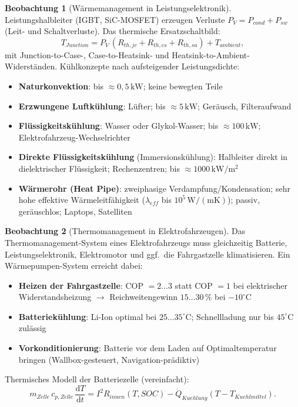 ﻿\documentclass[a4paper,12pt]{report}
\theoremstyle{definition}
\newtheorem{beobachtung}{Beobachtung}
\begin{document}
\begin{beobachtung}[Wärmemanagement in Leistungselektronik]
Leistungshalbleiter (IGBT, SiC-MOSFET) erzeugen Verluste
$P_V = P_{cond} + P_{sw}$ (Leit- und Schaltverluste).
Das thermische Ersatzschaltbild:
\[
  T_{Junction} = P_V\,(R_{th,jc} + R_{th,cs} + R_{th,sa}) + T_{ambient},
\]
mit Junction-to-Case-, Case-to-Heatsink- und Heatsink-to-Ambient-Widerständen.
Kühlkonzepte nach aufsteigender Leistungsdichte:
\begin{itemize}
    \item[-] \textbf{Naturkonvektion}: bis $\approx 0{,}5\,\mathrm{kW}$; keine bewegten Teile
    \item[-] \textbf{Erzwungene Luftkühlung}: Lüfter; bis $\approx 5\,\mathrm{kW}$;
          Geräusch, Filteraufwand
    \item[-] \textbf{Flüssigkeitskühlung}: Wasser oder Glykol-Wasser;
          bis $\approx 100\,\mathrm{kW}$; Elektrofahrzeug-Wechselrichter
    \item[-] \textbf{Direkte Flüssigkeitskühlung} (Immersionskühlung):
          Halbleiter direkt in dielektrischer Flüssigkeit; Rechenzentren;
          bis $\approx 1000\,\mathrm{kW/m^2}$
    \item[-] \textbf{Wärmerohr (Heat Pipe)}: zweiphasige Verdampfung/Kondensation;
          sehr hohe effektive Wärmeleitfähigkeit ($\lambda_{eff}$ bis $10^5\,\mathrm{W/(mK)}$);
          passiv, geräuschlos; Laptops, Satelliten
\end{itemize}
\end{beobachtung}


\begin{beobachtung}[Thermomanagement in Elektrofahrzeugen]
Das Thermomanagement-System eines Elektrofahrzeugs muss gleichzeitig
Batterie, Leistungselektronik, Elektromotor und ggf.\ die Fahrgastzelle klimatisieren.
Ein Wärmepumpen-System erreicht dabei:
\begin{itemize}
    \item[-] \textbf{Heizen der Fahrgastzelle}: COP $= 2\ldots3$
          statt COP $= 1$ bei elektrischer Widerstandsheizung
          $\to$ Reichweitengewinn $15\ldots30\,\%$ bei $-10^\circ\mathrm{C}$
    \item[-] \textbf{Batteriekühlung}: Li-Ion optimal bei $25\ldots35^\circ\mathrm{C}$;
          Schnellladung nur bis $45^\circ\mathrm{C}$ zulässig
    \item[-] \textbf{Vorkonditionierung}: Batterie vor dem Laden
          auf Optimaltemperatur bringen (Wallbox-gesteuert, Navigation-prädiktiv)
\end{itemize}
Thermisches Modell der Batteriezelle (vereinfacht):
\[
  m_{Zelle}\,c_{p,Zelle}\,\frac{\mathrm{d}T}{\mathrm{d}t}
  = I^2 R_{innen}(T,SOC) - \dot{Q}_{Kuehlung}(T - T_{Kuehlmittel}).
\]
\end{beobachtung}
\end{document}
